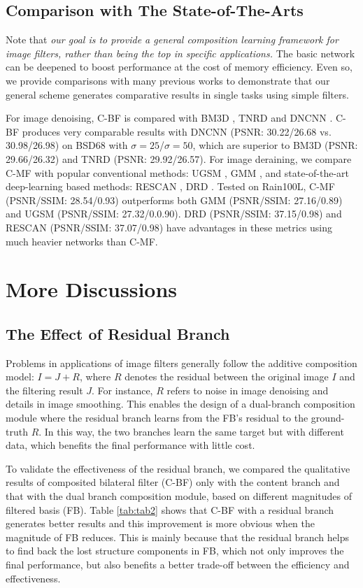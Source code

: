 \documentclass[twocolumn]{svjour3}          %
\begin{document}
\subsection{Comparison with The State-of-The-Arts}
Note that \textit{our goal is to provide a general composition learning framework for image filters, rather than being the top in specific applications.} 
The basic network can be deepened to boost performance at the cost of memory efficiency. Even so, we provide comparisons with many previous works to demonstrate that our general scheme generates comparative results in single tasks using simple filters.

For image denoising, C-BF is compared with BM3D \cite{bm3d}, TNRD \cite{tnrd} and DNCNN \cite{dncnn}. C-BF produces very comparable results with DNCNN \cite{dncnn} (PSNR: 30.22/26.68 vs. 30.98/26.98) on BSD68 with $\sigma=25$/$\sigma=50$, which are superior to BM3D \cite{bm3d} (PSNR: 29.66/26.32) and TNRD \cite{tnrd} (PSNR: 29.92/26.57).
For image deraining, we compare C-MF with popular conventional methods: UGSM \cite{deng2018directional}, GMM \cite{li2016rain}, and state-of-the-art deep-learning based methods: RESCAN \cite{li2018recurrent}, DRD \cite{deng2019drd}. Tested on Rain100L, C-MF (PSNR/SSIM: 28.54/0.93) outperforms both GMM (PSNR/SSIM: 27.16/0.89) and UGSM (PSNR/SSIM: 27.32/0.0.90). DRD (PSNR/SSIM: 37.15/0.98) and RESCAN (PSNR/SSIM: 37.07/0.98) have advantages in these metrics using much heavier networks than C-MF.

\section{More Discussions} \label{sec5}
\subsection{The Effect of Residual Branch}
Problems in applications of image filters generally follow the additive composition model: $I = J + R$, where $R$ denotes the residual between the original image $I$ and the filtering result $J$. For instance, $R$ refers to noise in image denoising and details in image smoothing. This enables the design of a dual-branch composition module where the residual branch learns from the FB's residual to the ground-truth $R$. In this way, the two branches learn the same target but with different data, which benefits the final performance with little cost.

To validate the effectiveness of the residual branch, we compared the qualitative results of composited bilateral filter (C-BF) only with the content branch and that with the dual branch composition module, based on different magnitudes of filtered basis (FB). Table \ref{tab:tab2} shows that C-BF with a residual branch generates better results and this improvement is more obvious when the magnitude of FB reduces. This is mainly because that the residual branch helps to find back the lost structure components in FB, which not only improves the final performance, but also benefits a better trade-off between the efficiency and effectiveness.
\end{document}
